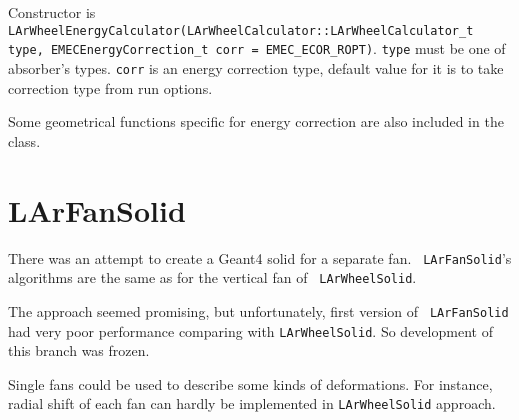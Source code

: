 \documentclass{article}
\begin{document}
Constructor is {\tt
LArWheelEnergyCalculator(LArWheelCalculator::LArWheelCalculator\_t type,
	                         EMECEnergyCorrection\_t corr = EMEC\_ECOR\_ROPT)}.
{\tt type} must be one of absorber's types. {\tt corr} is an energy correction
type, default value for it is to take correction type from run options.

Some geometrical functions specific for energy correction are also included in
the class.

\section{LArFanSolid}
There was an attempt to create a Geant4 solid for a separate fan. {\tt
LArFanSolid}'s algorithms are the same as for the vertical fan of {\tt
LArWheelSolid}.

The approach seemed promising, but unfortunately, first version of {\tt
LArFanSolid} had very poor performance comparing with {\tt LArWheelSolid}. So
development of this branch was frozen.

Single fans could be used to describe some kinds of deformations. For instance,
radial shift of each fan can hardly be implemented in {\tt LArWheelSolid}
approach.


\end{document}
